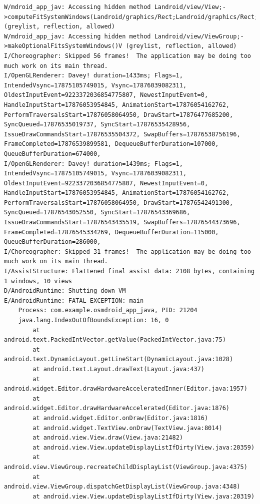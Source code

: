 \documentclass[a4paper,12pt]{book}
\begin{document}
\begin{lstlisting}
W/mdroid_app_jav: Accessing hidden method Landroid/view/View;->computeFitSystemWindows(Landroid/graphics/Rect;Landroid/graphics/Rect;)Z (greylist, reflection, allowed)
W/mdroid_app_jav: Accessing hidden method Landroid/view/ViewGroup;->makeOptionalFitsSystemWindows()V (greylist, reflection, allowed)
I/Choreographer: Skipped 56 frames!  The application may be doing too much work on its main thread.
I/OpenGLRenderer: Davey! duration=1433ms; Flags=1, IntendedVsync=17875105749015, Vsync=17876039082311, OldestInputEvent=9223372036854775807, NewestInputEvent=0, HandleInputStart=17876053954845, AnimationStart=17876054162762, PerformTraversalsStart=17876058064950, DrawStart=17876477685200, SyncQueued=17876535019737, SyncStart=17876535428956, IssueDrawCommandsStart=17876535504372, SwapBuffers=17876538756196, FrameCompleted=17876539899581, DequeueBufferDuration=107000, QueueBufferDuration=674000, 
I/OpenGLRenderer: Davey! duration=1439ms; Flags=1, IntendedVsync=17875105749015, Vsync=17876039082311, OldestInputEvent=9223372036854775807, NewestInputEvent=0, HandleInputStart=17876053954845, AnimationStart=17876054162762, PerformTraversalsStart=17876058064950, DrawStart=17876542491300, SyncQueued=17876543052550, SyncStart=17876543369686, IssueDrawCommandsStart=17876543435519, SwapBuffers=17876544373696, FrameCompleted=17876545334269, DequeueBufferDuration=115000, QueueBufferDuration=286000, 
I/Choreographer: Skipped 31 frames!  The application may be doing too much work on its main thread.
I/AssistStructure: Flattened final assist data: 2108 bytes, containing 1 windows, 10 views
D/AndroidRuntime: Shutting down VM
E/AndroidRuntime: FATAL EXCEPTION: main
    Process: com.example.osmdroid_app_java, PID: 21204
    java.lang.IndexOutOfBoundsException: 16, 0
        at android.text.PackedIntVector.getValue(PackedIntVector.java:75)
        at android.text.DynamicLayout.getLineStart(DynamicLayout.java:1028)
        at android.text.Layout.drawText(Layout.java:437)
        at android.widget.Editor.drawHardwareAcceleratedInner(Editor.java:1957)
        at android.widget.Editor.drawHardwareAccelerated(Editor.java:1876)
        at android.widget.Editor.onDraw(Editor.java:1816)
        at android.widget.TextView.onDraw(TextView.java:8014)
        at android.view.View.draw(View.java:21482)
        at android.view.View.updateDisplayListIfDirty(View.java:20359)
        at android.view.ViewGroup.recreateChildDisplayList(ViewGroup.java:4375)
        at android.view.ViewGroup.dispatchGetDisplayList(ViewGroup.java:4348)
        at android.view.View.updateDisplayListIfDirty(View.java:20319)

\end{lstlisting}
\end{document}
